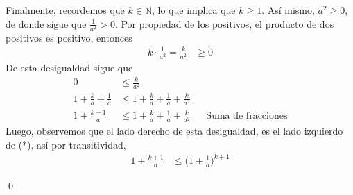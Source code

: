 \documentclass[11pt]{article}
\newcommand{\N}{\mathbb{N}}
\begin{document}
\begin{enumerate}
\begin{enumerate}[label=\roman*)]
 Finalmente, recordemos que $k\in \N$, lo que implica que $k\geq 1$. Así mismo, $a^2\geq 0$, de donde sigue que $\frac{1}{a^2}>0$. Por propiedad de los positivos, el producto de dos positivos es positivo, entonces \begin{align*}
  k \cdot \frac{1}{a^2} = \frac{k}{a^2} &\geq 0
 \end{align*} De esta desigualdad sigue que \begin{align*}
  0 &\leq \frac{k}{a^2} \\
  1+\frac{k}{a}+ \frac{1}{a} &\leq 1+\frac{k}{a}+ \frac{1}{a} + \frac{k}{a^2} \\
  1+\frac{k+1}{a} &\leq 1+\frac{k}{a}+ \frac{1}{a} + \frac{k}{a^2} && \text{Suma de fracciones}
 \end{align*} Luego, observemos que el lado derecho de esta desigualdad, es el lado izquierdo de (*), así por transitividad, \begin{align*}
  1+\frac{k+1}{a} &\leq \biggl(1+\frac{1}{a}\biggr)^{k+1}
 \end{align*}
\end{enumerate} \qed
\end{enumerate} 
\end{document}
